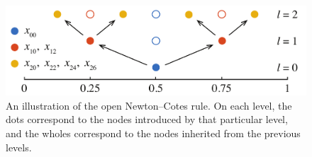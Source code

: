 \begin{figure}[t]
  \centering
  \includegraphics[width=1.0\columnwidth]{include/assets/figures/grid.pdf}
  \caption{
    An illustration of the open Newton--Cotes rule. On each level, the dots
    correspond to the nodes introduced by that particular level, and the wholes
    correspond to the nodes inherited from the previous levels.
  }
\end{figure}
